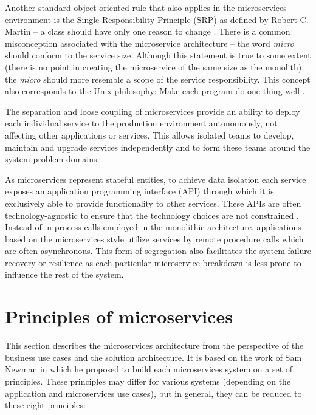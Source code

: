 \documentclass[oneside,
  digital, %
  table,   %
  lof,     %
  lot,     %
]{fithesis3}
\begin{document}
Another standard object-oriented rule that also applies in the microservices environment is the Single Responsibility Principle (SRP) as defined by Robert C. Martin -- a class should have only one reason to change \cite{agile_ppp_c}. There is a common misconception associated with the microservice architecture -- the word \textit{micro} should conform to the service size. Although this statement is true to some extent (there is no point in creating the microservice of the same size as the monolith), the \textit{micro} should more resemble a scope of the service responsibility. This concept also corresponds to the Unix philosophy: Make each program do one thing well \cite{unix_time_sharing_foreword}.

The separation and loose coupling of microservices provide an ability to deploy each individual service to the production environment autonomously, not affecting other applications or services. This allows isolated teams to develop, maintain and upgrade services independently and to form these teams around the system problem domains. 

As microservices represent stateful entities, to achieve data isolation each service exposes an application programming interface (API) through which it is exclusively able to provide functionality to other services. These APIs are often technology-agnostic to ensure that the technology choices are not constrained \cite{building_ms}. Instead of in-process calls employed in the monolithic architecture, applications based on the microservices style utilize services by remote procedure calls which are often asynchronous. This form of segregation also facilitates the system failure recovery or resilience as each particular microservice breakdown is less prone to influence the rest of the system.

\section{Principles of microservices}

This section describes the microservices architecture from the perspective of the business use cases and the solution architecture. It is based on the work of Sam Newman \cite{building_ms, principles_of_microservices} in which he proposed to build each microservices system on a set of principles. These principles may differ for various systems (depending on the application and microservices use cases), but in general, they can be reduced to these eight principles:
\end{document}

